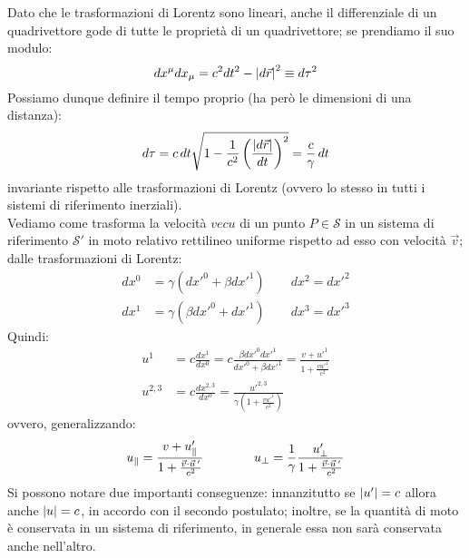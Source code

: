 Dato che le trasformazioni di Lorentz sono lineari, anche il differenziale di un quadrivettore gode di tutte le proprietà di un quadrivettore; se prendiamo il suo modulo:
\begin{equation}
	dx^{\mu}dx_{\mu} = c^2dt^2 - \left\lvert d\vec{r}\right\rvert^2 \equiv d\tau^2
	\label{eq:11}
\end{equation}
Possiamo dunque definire il tempo proprio (ha però le dimensioni di una distanza):
\begin{equation}
	d\tau = c \,dt \sqrt{1 - \displaystyle\frac{1}{c^2}\left(\displaystyle\frac{\left\lvert d\vec{r}\right\rvert}{dt}\right)^2} = \displaystyle\frac{c}{\gamma}\,dt
	\label{eq:12}
\end{equation}
invariante rispetto alle trasformazioni di Lorentz (ovvero lo stesso in tutti i sistemi di riferimento inerziali). \\ 
%
Vediamo come trasforma la velocità $ vec{u} $ di un punto $ P \in \mathcal{S} $ in un sistema di riferimento $ \mathcal{S}' $ in moto relativo rettilineo uniforme rispetto ad esso con velocità $ \vec{v} $; dalle trasformazioni di Lorentz:
\begin{equation}
	\begin{split}
		dx^0 &= \gamma (dx'^0 + \beta dx'^1) \qquad dx^2 = dx'^2 \\ 
		dx^1 &= \gamma (\beta dx'^0 + dx'^1) \qquad dx^3 = dx'^3
	\end{split}
	\label{eq:13}
\end{equation}
Quindi:
\begin{equation}
	\begin{split}
		u^1 &= c \displaystyle\frac{dx^1}{dx^0} = c \displaystyle\frac{\beta dx'^0 dx'^1}{dx'^0 + \beta dx'^1} = \displaystyle\frac{v + u'^1}{1 + \frac{vu'^1}{c^2}} \\ 
		u^{2,3} &= c \displaystyle\frac{dx^{2,3}}{dx^0} = \displaystyle\frac{u'^{2,3}}{\gamma (1 + \frac{vu'^1}{c^2})}
	\end{split}
	\label{eq:14}
\end{equation}
ovvero, generalizzando:
\begin{equation}
	u_{\parallel} = \displaystyle\frac{v + u'_{\parallel}}{1 + \frac{\vec{v}\cdot\vec{u}\,'}{c^2}} \qquad\qquad u_{\perp} = \displaystyle\frac{1}{\gamma}\displaystyle\frac{u'_{\perp}}{1 + \frac{\vec{v}\cdot\vec{u}\,'}{c^2}}
	\label{eq:15}
\end{equation}
Si possono notare due importanti conseguenze: innanzitutto se $ \left\lvert u'\right\rvert = c $ allora anche $ \left\lvert u\right\rvert = c $, in accordo con il secondo postulato; inoltre, se la quantità di moto è conservata in un sistema di riferimento, in generale essa non sarà conservata anche nell'altro. \\ 
